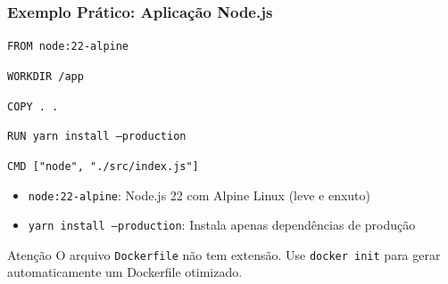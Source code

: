 \begin{frame}
  \frametitle{Exemplo Prático: Aplicação Node.js}
  \texttt{FROM node:22-alpine}

  \texttt{WORKDIR /app}

  \texttt{COPY . .}

  \texttt{RUN yarn install --production}

  \texttt{CMD ["node", "./src/index.js"]}

  \vspace{0.5em}
  \begin{itemize}
    \item \texttt{node:22-alpine}: Node.js 22 com Alpine Linux (leve e enxuto)
    \item \texttt{yarn install --production}: Instala apenas dependências de produção
  \end{itemize}

  \vspace{0.5em}
  \begin{alertblock}{Atenção}
    O arquivo \texttt{Dockerfile} não tem extensão. Use \texttt{docker init}
    para gerar automaticamente um Dockerfile otimizado.
  \end{alertblock}
\end{frame}
